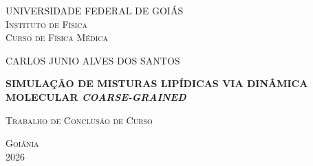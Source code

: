\thispagestyle{empty}
\begin{center}
{\fontsize{12}{13.8}\selectfont
UNIVERSIDADE FEDERAL DE GOIÁS \\
\textsc{Instituto de Física} \\
\textsc{Curso de Física Médica}\par}

\vspace*{11\baselineskip}

{\fontsize{12}{13.8}\selectfont CARLOS JUNIO ALVES DOS SANTOS\par}

\vspace*{4\baselineskip}

{\fontsize{16}{18.4}\selectfont \textbf{SIMULAÇÃO DE MISTURAS LIPÍDICAS VIA DINÂMICA MOLECULAR \textit{COARSE-GRAINED}}\par}

\vspace*{\fill}

{\fontsize{14}{16.1}\selectfont \textsc{Trabalho de Conclusão de Curso}\par}

\vspace*{5\baselineskip}

{\fontsize{12}{13.8}\selectfont
\textsc{Goiânia} \\
2026\par}
\end{center}

\newpage



